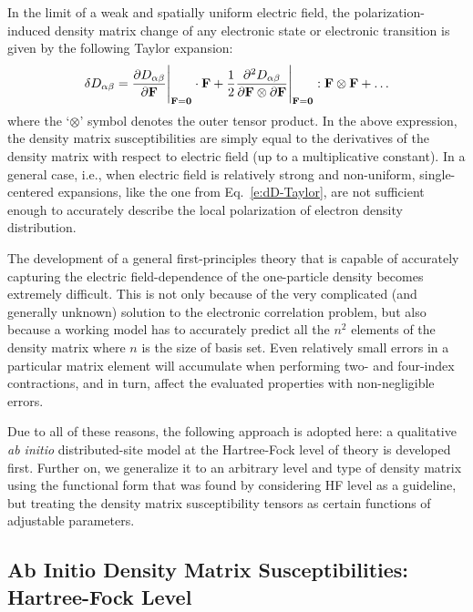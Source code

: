 \documentclass[aip,jcp,preprint,amsmath,amssymb,floatfix]{revtex4-1}
\begin{document}
In the limit of a weak and spatially uniform electric field,
the polarization\hyp{}induced density matrix change of any electronic state
or electronic transition is given by the following Taylor expansion:
%
\begin{equation}\label{e:dD-Taylor}
 \delta D_{\alpha\beta} = \frac{\partial D_{\alpha\beta}}{\partial {\bf F}}\Bigg|_{{\bf F}={\bf 0}}  \cdot {\bf F} 
   + \frac{1}{2} 
     \frac{\partial^2 D_{\alpha\beta}}{\partial {\bf F} \otimes \partial {\bf F}}\Bigg|_{{\bf F}={\bf 0}} : {\bf F} \otimes {\bf F}
   + \ldots 
\end{equation}
%
where the `$\otimes$' symbol denotes the outer tensor product.
In the above expression, the density matrix susceptibilities 
are simply equal to the derivatives of the density matrix
with respect to electric field (up to a multiplicative constant).
In a general case, i.e., when electric field is relatively strong 
and non\hyp{}uniform, single\hyp{}centered expansions, like the one 
from Eq.~\eqref{e:dD-Taylor},
are not sufficient enough to accurately describe the local polarization
of electron density distribution.

The development of a general first\hyp{}principles theory
that is capable of accurately capturing the electric field\hyp{}dependence 
of the one\hyp{}particle density becomes extremely difficult. This is not 
only because of the very complicated (and generally unknown) solution
to the electronic correlation problem, but also because a working model 
has to accurately predict all the $n^2$ elements of the density matrix
where $n$ is the size of basis set. Even relatively small errors
in a particular matrix element will accumulate when performing two\hyp{}
and four\hyp{}index contractions, and in turn, affect the evaluated properties 
with non\hyp{}negligible errors. 

Due to all of these reasons, the following approach is adopted here: 
a qualitative \emph{ab initio} distributed\hyp{}site 
model at the Hartree\hyp{}Fock level of theory is developed first. 
Further on, we generalize it 
to an arbitrary level and type of density matrix
using the functional form that was found by considering HF level as a guideline,
but treating the density matrix susceptibility tensors as certain functions 
of adjustable parameters.

\subsection{Ab Initio Density Matrix Susceptibilities: Hartree-Fock Level}
\end{document}
